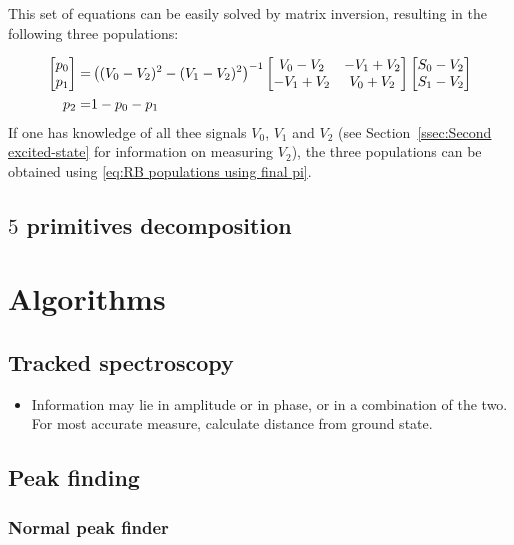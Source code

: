       This set of equations can be easily solved by matrix inversion, resulting in the following three populations:

      \begin{align}
        \begin{bmatrix}
          p_0 \\
          p_1
        \end{bmatrix}
        = &
        \left((V_0-V_2)^2 - (V_1 - V_2)^2\right)^{-1}
        \begin{bmatrix}
          V_0 - V_2 & -V_1 + V_2 \\
          -V_1 + V_2 & V_0 + V_2
        \end{bmatrix}
        \begin{bmatrix}
          S_0 - V_2 \\
          S_1 - V_2
        \end{bmatrix} \notag\\
        p_2 = & 1 - p_0 - p_1
        \label{eq:RB populations using final pi}
      \end{align}
      If one has knowledge of all thee signals $V_0$, $V_1$ and $V_2$ (see Section~\ref{ssec:Second excited-state} for information on measuring $V_2$), the three populations can be obtained using \ref{eq:RB populations using final pi}.
    \section{$5$ primitives decomposition}
      \label{sec:5 primitives decomposition}

\chapter{Algorithms}
  \section{Tracked spectroscopy}
  \label{sec:Tracked spectroscopy}
    \begin{itemize}
      \item Information may lie in amplitude or in phase, or in a combination of the two. For most accurate measure, calculate distance from ground state.
    \end{itemize}
  \section{Peak finding}
    \subsection{Normal peak finder}
